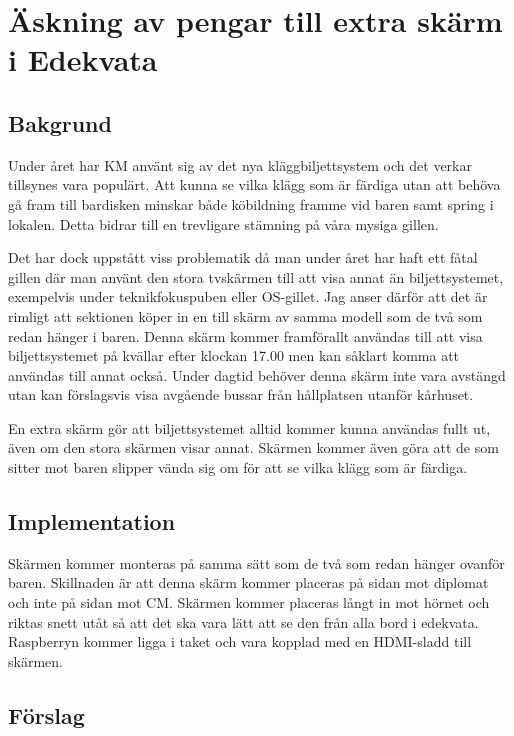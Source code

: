 \documentclass[10pt]{article}
\def\doctype{Handlingar} %
\def\mname{styrelsemöte} %
\def\mnum{S12/18} %
\begin{document}
    
    \heading{{\doctype} till {\mname} {\mnum}}
    
    \section*{Äskning av pengar till extra skärm i Edekvata}
    
    \subsection*{Bakgrund}
    Under året har KM använt sig av det nya kläggbiljettsystem och det verkar tillsynes vara populärt. Att kunna se vilka klägg som är färdiga utan att behöva gå fram till bardisken minskar både köbildning framme vid baren samt spring i lokalen. Detta bidrar till en trevligare stämning på våra mysiga gillen. 
    
    Det har dock uppstått viss problematik då man under året har haft ett fåtal gillen där man använt den stora tvskärmen till att visa annat än biljettsystemet, exempelvis under teknikfokuspuben eller OS-gillet. 
    Jag anser därför att det är rimligt att sektionen köper in en till skärm av samma modell som de två som redan hänger i baren. Denna skärm kommer framförallt användas till att visa biljettsystemet på kvällar efter klockan 17.00 men kan såklart komma att användas till annat också. Under dagtid behöver denna skärm inte vara avstängd utan kan förslagsvis visa avgående bussar från hållplatsen utanför kårhuset. 

    En extra skärm gör att biljettsystemet alltid kommer kunna användas fullt ut, även om den stora skärmen visar annat. Skärmen kommer även göra att de som sitter mot baren slipper vända sig om för att se vilka klägg som är färdiga.
    \subsection*{Implementation}
    Skärmen kommer monteras på samma sätt som de två som redan hänger ovanför baren. Skillnaden är att denna skärm kommer placeras på sidan mot diplomat och inte på sidan mot CM. Skärmen kommer placeras långt in mot hörnet och riktas snett utåt så att det ska vara lätt att se den från alla bord i edekvata. Raspberryn kommer ligga i taket och vara kopplad med en HDMI-sladd till skärmen. 

    \subsection*{Förslag}
    
\end{document}
